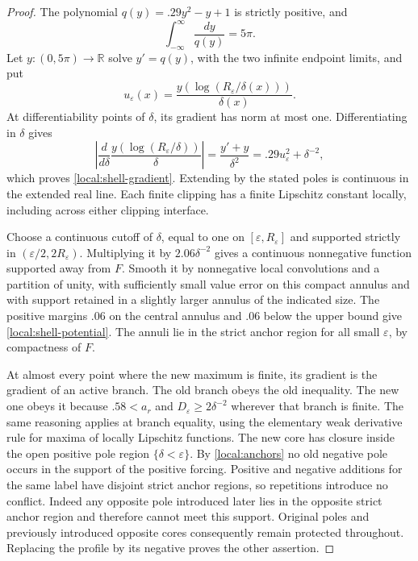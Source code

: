 \documentclass[11pt]{article}
\numberwithin{equation}{section}
\theoremstyle{definition}
\theoremstyle{remark}
\begin{document}
\begin{proof}
The polynomial
$q(y)=.29y^2-y+1$ is strictly positive, and
\[
 \int_{-\infty}^{\infty}\frac{dy}{q(y)}=5\pi.
\]
Let $y:(0,5\pi)\longrightarrow\mathbb R$ solve $y'=q(y)$, with the two
infinite endpoint limits, and put
\[
 u_\varepsilon(x)=\frac{y(\log(R_\varepsilon/\delta(x)))}{\delta(x)}.
\]
At differentiability points of $\delta$, its gradient has norm at
most one.  Differentiating in $\delta$ gives
\[
 \left|\frac{d}{d\delta}\frac{y(\log(R_\varepsilon/\delta))}{\delta}\right|
   =\frac{y'+y}{\delta^2}
   =.29u_\varepsilon^2+\delta^{-2},
\]
which proves \eqref{local:shell-gradient}.  Extending by the stated
poles is continuous in the extended real line.  Each finite clipping
has a finite Lipschitz constant locally, including across either
clipping interface.

Choose a continuous cutoff of $\delta$, equal to one on
$[\varepsilon,R_\varepsilon]$ and supported strictly in
$(\varepsilon/2,2R_\varepsilon)$.  Multiplying it by
$2.06\delta^{-2}$ gives a continuous nonnegative function supported
away from $F$.  Smooth it by nonnegative local convolutions and a
partition of unity, with sufficiently small value error on this
compact annulus and with support retained in a slightly larger
annulus of the indicated size.  The positive margins $.06$ on the
central annulus and $.06$ below the upper bound give
\eqref{local:shell-potential}.  The annuli lie in the strict anchor
region for all small $\varepsilon$, by compactness of $F$.

At almost every point where the new maximum is finite, its gradient
is the gradient of an active branch.  The old branch obeys the old
inequality.  The new one obeys it because $.58<a_r$ and
$D_\varepsilon\ge2\delta^{-2}$ wherever that branch is finite.
The same reasoning applies at branch equality, using the elementary
weak derivative rule for maxima of locally Lipschitz functions.
The new core has closure inside the open positive pole region
$\{\delta<\varepsilon\}$.  By \cref{local:anchors} no old negative
pole occurs in the support of the positive forcing.  Positive and
negative additions for the same label have disjoint strict anchor
regions, so repetitions introduce no conflict.  Indeed any opposite
pole introduced later lies in the opposite strict anchor region and
therefore cannot meet this support.  Original poles and previously
introduced opposite cores consequently remain protected throughout.
Replacing the profile by its negative proves the other assertion.
\end{proof}
\end{document}
